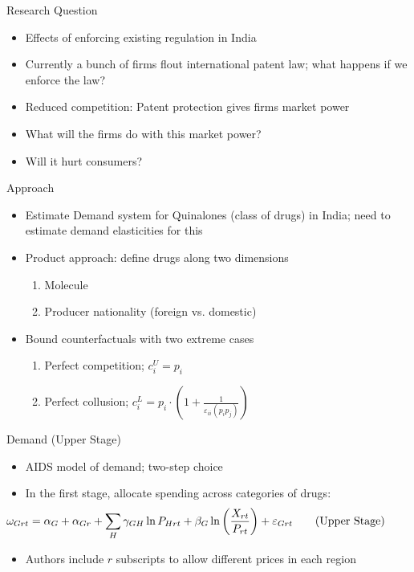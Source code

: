 \documentclass{beamer}
\begin{document}
\begin{frame}{Research Question}
  \begin{itemize}
  \item  Effects of enforcing existing regulation in India
    \vfill
  \item Currently a bunch of firms flout international patent law; what happens if we enforce the law?
    \vfill
  \item Reduced competition: Patent protection gives firms market power
    \vfill
  \item What will the firms do with this market power?
    \vfill
    \item Will it hurt consumers?
  \end{itemize}
\end{frame}
%
\begin{frame}{Approach}
  \begin{itemize}
  \item Estimate Demand system for Quinalones (class of drugs) in India; need to estimate demand elasticities for this
    \vfill
  \item Product approach: define drugs along two dimensions
    \begin{enumerate}
    \item Molecule
      \item Producer nationality (foreign vs. domestic)
    \end{enumerate}
    \vfill
  \item Bound counterfactuals with two extreme cases
    \begin{enumerate}
    \item Perfect competition; $c_i^U = p_i$
      \item Perfect collusion; $c_i^L = p_i \cdot \left(1 + \frac{1}{\varepsilon_{ii}(p_i p_j)}\right) $
    \end{enumerate}
  \end{itemize}
\end{frame}
%
\begin{frame}{Demand (Upper Stage)}
  \begin{itemize}
  \item AIDS model of demand; two-step choice
    \vfill
  \item In the first stage, allocate spending across categories of drugs:
    \begin{equation}
      \label{eq:1}
    \hspace{-4em} \omega_{Grt} = \alpha_G + \alpha_{Gr} + \sum_H \gamma_{GH} \ln P_{Hrt} + \beta_G \ln \left(\frac{X_{rt}}{P_{rt}}\right) + \varepsilon_{Grt} \tag{Upper Stage}
    \end{equation}
    \vfill
    \item Authors include $r$ subscripts to allow different prices in each region 
  \end{itemize}
\end{frame}
\end{document}
